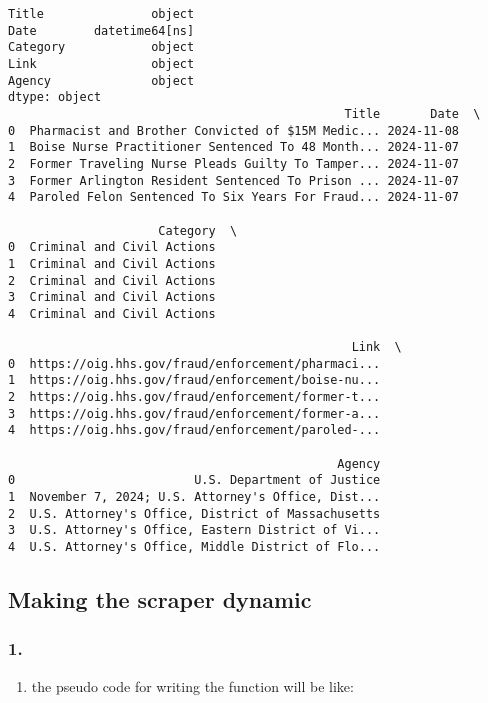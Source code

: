 \documentclass[
  letterpaper,
  DIV=11,
  numbers=noendperiod]{scrartcl}
\providecommand{\tightlist}{%
  \setlength{\itemsep}{0pt}\setlength{\parskip}{0pt}}\usepackage{longtable,booktabs,array}
\begin{document}
\begin{verbatim}
Title               object
Date        datetime64[ns]
Category            object
Link                object
Agency              object
dtype: object
                                               Title       Date  \
0  Pharmacist and Brother Convicted of $15M Medic... 2024-11-08   
1  Boise Nurse Practitioner Sentenced To 48 Month... 2024-11-07   
2  Former Traveling Nurse Pleads Guilty To Tamper... 2024-11-07   
3  Former Arlington Resident Sentenced To Prison ... 2024-11-07   
4  Paroled Felon Sentenced To Six Years For Fraud... 2024-11-07   

                     Category  \
0  Criminal and Civil Actions   
1  Criminal and Civil Actions   
2  Criminal and Civil Actions   
3  Criminal and Civil Actions   
4  Criminal and Civil Actions   

                                                Link  \
0  https://oig.hhs.gov/fraud/enforcement/pharmaci...   
1  https://oig.hhs.gov/fraud/enforcement/boise-nu...   
2  https://oig.hhs.gov/fraud/enforcement/former-t...   
3  https://oig.hhs.gov/fraud/enforcement/former-a...   
4  https://oig.hhs.gov/fraud/enforcement/paroled-...   

                                              Agency  
0                         U.S. Department of Justice  
1  November 7, 2024; U.S. Attorney's Office, Dist...  
2  U.S. Attorney's Office, District of Massachusetts  
3  U.S. Attorney's Office, Eastern District of Vi...  
4  U.S. Attorney's Office, Middle District of Flo...  
\end{verbatim}

\subsection{Making the scraper
dynamic}\label{making-the-scraper-dynamic}

\subsubsection{1.}\label{section-2}

\begin{enumerate}
\def\labelenumi{\alph{enumi}.}
\tightlist
\item
  the pseudo code for writing the function will be like:
\end{enumerate}
\end{document}
